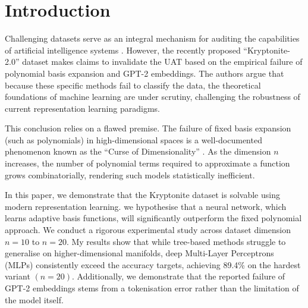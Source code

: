 \documentclass{article}
\newcommand{\csection}[1]{\section{\textcolor{imperialblue}{#1}}}
\begin{document}
\begin{abstract}
The paper “Kryptonite-2.0” \citep{harley2025} strongly asserts that procedurally generated datasets expose fundamental limitations in modern machine learning, especially challenging the validity of the Universal Approximation Theorem (UAT). The authors have made an argument that the failure of the polynomial regression implies a failure of the broader research field. Through this paper, we refute this claim by demonstrating that the reported failure is a predictable consequence of the curse of dimensionality affecting fixed basis expansions, rather than an intrinsic flaw in interconnected models. We implement a Multi-Layer Perceptron (MLP) with a systematic architecture search, achieving \textbf{89.4\%} test accuracy on the maximal $n=20$ dataset. This performance substantially exceeds the 75\% target threshold. Furthermore, we have also provided a comprehensive sustainability analysis and uncertainty calibration audit, demonstrating that deep learning models can solve these high-dimensional manifolds both efficiently and reliably, thereby refuting the hypothesis put forward by the paper.
\end{abstract}

\csection{Introduction}


Challenging datasets serve as an integral mechanism for auditing the capabilities of artificial intelligence systems \citep{chollet2019}. However, the recently proposed “Kryptonite-2.0” dataset \citep{harley2025} makes claims to invalidate the UAT based on the empirical failure of polynomial basis expansion and GPT-2 embeddings. The authors argue that because these specific methods fail to classify the data, the theoretical foundations of machine learning are under scrutiny, challenging the robustness of current representation learning paradigms.

This conclusion relies on a flawed premise. The failure of fixed basis expansion (such as polynomials) in high-dimensional spaces is a well-documented phenomenon known as the “Curse of Dimensionality” \citep{bishop2006}. As the dimension $n$ increases, the number of polynomial terms required to approximate a function grows combinatorially, rendering such models statistically inefficient.

In this paper, we demonstrate that the Kryptonite dataset is solvable using modern representation learning. we hypothesise that a neural network, which learns adaptive basis functions, will significantly outperform the fixed polynomial approach. We conduct a rigorous experimental study across dataset dimension $n=10$ to $n=20$. My results show that while tree-based methods struggle to generalise on higher-dimensional manifolds, deep Multi-Layer Perceptrons (MLPs) consistently exceed the accuracy targets, achieving 89.4\% on the hardest variant $(n=20)$. Additionally, we demonstrate that the reported failure of GPT-2 embeddings stems from a tokenisation error rather than the limitation of the model itself.
\end{document}

